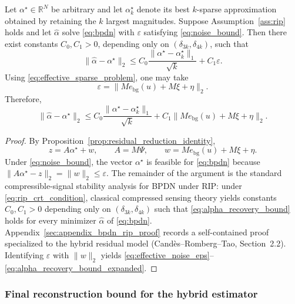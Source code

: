 \begin{theorem}
\label{thm:stable_sparse_hybrid_residual}
Let $\alpha^\star\in\mathbb{R}^N$ be arbitrary and let $\alpha^\star_k$ denote its best $k$-sparse approximation obtained by retaining the $k$ largest magnitudes.
Suppose Assumption~\ref{ass:rip} holds and let $\widehat{\alpha}$ solve \eqref{eq:bpdn} with $\varepsilon$ satisfying \eqref{eq:noise_bound}.
Then there exist constants $C_0,C_1>0$, depending only on $(\delta_{3k},\delta_{4k})$, such that
\begin{equation}
  \|\widehat{\alpha}-\alpha^\star\|_2
  \le
  C_0 \frac{\|\alpha^\star-\alpha^\star_k\|_1}{\sqrt{k}}
  +
  C_1 \varepsilon.
  \label{eq:alpha_recovery_bound}
\end{equation}
Using \eqref{eq:effective_sparse_problem}, one may take
\begin{equation}
  \varepsilon
  =
  \|M e_{\mathrm{bg}}(u) + M\xi + \eta\|_2.
  \label{eq:effective_noise_eps}
\end{equation}
Therefore,
\begin{equation}
  \|\widehat{\alpha}-\alpha^\star\|_2
  \le
  C_0 \frac{\|\alpha^\star-\alpha^\star_k\|_1}{\sqrt{k}}
  +
  C_1 \|M e_{\mathrm{bg}}(u) + M\xi + \eta\|_2.
  \label{eq:alpha_recovery_bound_expanded}
\end{equation}
\end{theorem}

\begin{proof}
By Proposition~\ref{prop:residual_reduction_identity},
\[
  z=A\alpha^\star+w,
  \qquad
  A=M\Psi,
  \qquad
  w=M e_{\mathrm{bg}}(u)+M\xi+\eta.
\]
Under \eqref{eq:noise_bound}, the vector $\alpha^\star$ is feasible for \eqref{eq:bpdn} because $\|A\alpha^\star-z\|_2=\|w\|_2\le \varepsilon$.
The remainder of the argument is the standard compressible-signal stability analysis for BPDN under RIP: under \eqref{eq:rip_crt_condition}, classical compressed sensing theory yields constants $C_0,C_1>0$ depending only on $(\delta_{3k},\delta_{4k})$ such that \eqref{eq:alpha_recovery_bound} holds for every minimizer $\widehat{\alpha}$ of \eqref{eq:bpdn}.
Appendix~\ref{sec:appendix_bpdn_rip_proof} records a self-contained proof specialized to the hybrid residual model (Cand\`es--Romberg--Tao, Section~2.2).
Identifying $\varepsilon$ with $\|w\|_2$ yields \eqref{eq:effective_noise_eps}--\eqref{eq:alpha_recovery_bound_expanded}.
\end{proof}

\subsubsection{Final reconstruction bound for the hybrid estimator}

